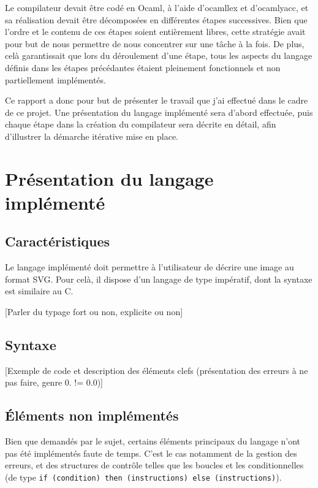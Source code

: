 \documentclass[a4paper, 12pt]{report}
\begin{document}
Le compilateur devait être codé en Ocaml, à l'aide d'ocamllex et d'ocamlyacc, et sa réalisation devait être décomposées en différentes étapes successives. Bien que l'ordre et le contenu de ces étapes soient entièrement libres, cette stratégie avait pour but de nous permettre de nous concentrer sur une tâche à la fois. De plus, celà garantissait que lors du déroulement d'une étape, tous les aspects du langage définis dans les étapes précédantes étaient pleinement fonctionnels et non partiellement implémentés.

Ce rapport a donc pour but de présenter le travail que j'ai effectué dans le cadre de ce projet. Une présentation du langage implémenté sera d'abord effectuée, puis chaque étape dans la création du compilateur sera décrite en détail, afin d'illustrer la démarche itérative mise en place.

\chapter{Présentation du langage implémenté}

	\section{Caractéristiques}
	
	Le langage implémenté doit permettre à l'utilisateur de décrire une image au format SVG. Pour celà, il dispose d'un langage de type impératif, dont la syntaxe est similaire au C.
	
	[Parler du typage fort ou non, explicite ou non]
	
	\section{Syntaxe}
	
	[Exemple de code et description des éléments clefs (présentation des erreurs à ne pas faire, genre 0. != 0.0)]
	
	\section{\'Eléments non implémentés}
	
	Bien que demandés par le sujet, certains éléments principaux du langage n'ont pas été implémentés faute de temps. C'est le cas notamment de la gestion des erreurs, et des structures de contrôle telles que les boucles et les conditionnelles (de type \texttt{if (condition) then (instructions) else (instructions)}).
\end{document}
